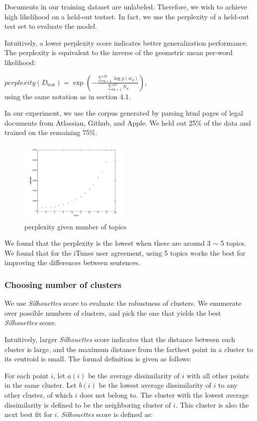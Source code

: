 \documentclass[conference,compsoc]{IEEEtran}
\begin{document}
  Documents in our training dataset are unlabeled. Therefore, we wish to achieve high likelihood on a held-out testset. In fact, we use the perplexity of a held-out test set to evaluate the model. 

  Intuitively, a lower perplexity score indicates better generalization performance. The perplexity is equivalent to the inverse of the geometric mean per-word likelihood: 

  $perplexity(D_{\text{test}}) = \exp( - \frac{\sum_{d=1}^M \log p(w_d)}{\sum_{d=1}^M N_d})$, \\
   using the same notation as in section 4.1. 

  In our experiment, we use the corpus generated by parsing html pages of legal documents from Atlassian, Github, and Apple. We held out 25\% of the data and trained on the remaining 75\%. 
  \begin{figure}[h!]
  \centering
          \includegraphics[height=4cm]{perplexity.png}
      \caption{perplexity given number of topics}
      \label{fig:verticalcell}
  \end{figure}

  We found that the perplexity is the lowest when there are around 3 $\sim$ 5 topics. We found that for the iTunes user agreement, using 5 topics works the best for improving the differences between sentences. 

  \subsubsection{Choosing number of clusters}
  We use \emph{Silhouettes} \cite{sil} score to evaluate the robustness of clusters. We enumerate over possible numbers of clusters, and pick the one that yields the best \emph{Silhouettes} score. 

  Intuitively, larger \emph{Silhouettes} score indicates that the distance between each cluster is large, and the maximum distance from the farthest point in a cluster to its centroid is small. The formal definition is given as follows: 

  For each point $i$, let $a(i)$ be the average dissimilarity of $i$ with all other points in the same cluster. Let $b(i)$ be the lowest average dissimilarity of $i$ to any other cluster, of which $i$ does not belong to. The cluster with the lowest average dissimilarity is defined to be the neighboring cluster of $i$. This cluster is also the next best fit for $i$. \emph{Silhouettes} score is defined as: 
\end{document}
